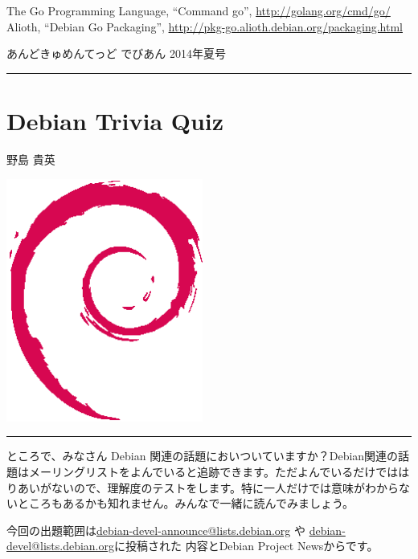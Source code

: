 \documentclass[mingoth,a4paper]{jsarticle}
\renewcommand{\dancersection}[2]{%
\newpage
あんどきゅめんてっど でびあん 2014年夏号
%
\vspace{0.1mm}\\
{\color{dancerdarkblue}\rule{\hsize}{2mm}}

%
%
\begin{minipage}[t]{0.6\hsize}
\color{dancerdarkblue}
\vspace{1cm}
\section{#1}
\hfill{}#2\\
\end{minipage}
\begin{minipage}[t]{0.4\hsize}
\vspace{-2cm}
\hfill{}\includegraphics[height=8cm]{image200502/openlogo-nd.eps}\\
\vspace{-5cm}
\end{minipage}
%
{\color{dancerlightblue}\rule{0.66\hsize}{2mm}}
%
\vspace{2cm}
}
\begin{document}
\begin{thebibliography}{0}
    {\footnotesize{
        The Go Programming Language, ``Command go'',
        \url{http://golang.org/cmd/go/}}}
    {\footnotesize{
        Alioth, ``Debian Go Packaging'',
        \url{http://pkg-go.alioth.debian.org/packaging.html}}}
\end{thebibliography}


\dancersection{Debian Trivia Quiz}{野島 貴英}

ところで、みなさん Debian 関連の話題においついていますか？Debian関連の話
題はメーリングリストをよんでいると追跡できます。ただよんでいるだけではは
りあいがないので、理解度のテストをします。特に一人だけでは意味がわからな
いところもあるかも知れません。みんなで一緒に読んでみましょう。

今回の出題範囲は\url{debian-devel-announce@lists.debian.org} や \url{debian-devel@lists.debian.org}に投稿された
内容とDebian Project Newsからです。

\begin{multicols}{2}






\end{multicols}

\printindex
\end{document}
